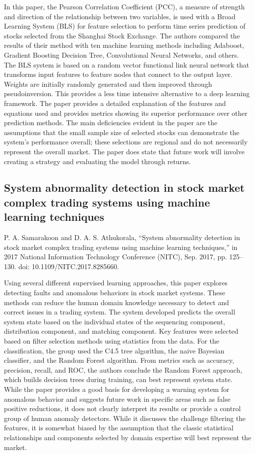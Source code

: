\documentclass[12pt]{article}
\begin{document}
In this paper, the Pearson Correlation Coefficient (PCC), a measure of strength and direction of the relationship between two variables, is used with a Broad Learning System (BLS) for feature selection to perform time series prediction of stocks selected from the Shanghai Stock Exchange. The authors compared the results of their method with ten machine learning methods including Adaboost, Gradient Boosting Decision Tree, Convolutional Neural Networks, and others. The BLS system is based on a random vector functional link neural network that transforms input features to feature nodes that connect to the output layer. Weights are initially randomly generated and then improved through pseudoinversion. This provides a less time intensive alternative to a deep learning framework. The paper provides a detailed explanation of the features and equations used and provides metrics showing its superior performance over other prediction methods. The main deficiencies evident in the paper are the assumptions that the small sample size of selected stocks can demonstrate the system's performance overall; these selections are regional and do not necessarily represent the overall market. The paper does state that future work will involve creating a strategy and evaluating the model through returns.


\subsection{System abnormality detection in stock market complex trading systems using machine learning techniques}
P. A. Samarakoon and D. A. S. Athukorala, “System abnormality detection in stock market complex trading systems using machine learning techniques,” in 2017 National Information Technology Conference (NITC), Sep. 2017, pp. 125–130. doi: 10.1109/NITC.2017.8285660.
\newline

Using several different supervised learning approaches, this paper explores detecting faults and anomalous behaviors in stock market systems. These methods can reduce the human domain knowledge necessary to detect and correct issues in a trading system. The system developed predicts the overall system state based on the individual states of the sequencing component, distribution component, and matching component. Key features were selected based on filter selection methods using statistics from the data. For the classification, the group used the C4.5 tree algorithm, the naive Bayesian classifier, and the Random Forest algorithm. From metrics such as accuracy, precision, recall, and ROC, the authors conclude the Random Forest approach, which builds decision trees during training, can best represent system state. While the paper provides a good basis for developing a warning system for anomalous behavior and suggests future work in specific areas such as false positive reductions, it does not clearly interpret its results or provide a control group of human anomaly detectors. While it discusses the challenge filtering the features, it is somewhat biased by the assumption that the classic statistical relationships and components selected by domain expertise will best represent the market.
\end{document}
